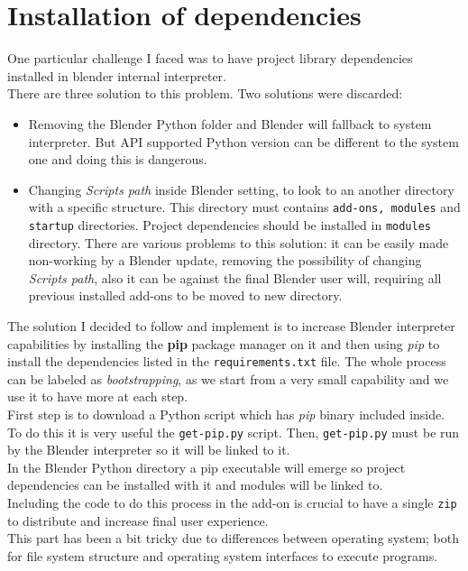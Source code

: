 \section{Installation of dependencies}
One particular challenge I faced was to have project library dependencies installed in blender internal interpreter. \\
There are three solution to this problem. Two solutions were discarded: 
\begin{itemize}
\item Removing the Blender Python folder and Blender will fallback to system interpreter. But API supported Python version can be different to the system one and doing this is dangerous.
\item Changing \textit{Scripts path} inside Blender setting, to look to an another directory with a specific structure. This directory must contains \texttt{add-ons, modules} and \texttt{startup} directories. Project dependencies should be installed in \texttt{modules} directory. There are various problems to this solution: it can be easily made non-working by a Blender update, removing the possibility of changing \textit{Scripts path}, also it can be against the final Blender user will, requiring all previous installed add-ons to be moved to new directory.
\end{itemize}
The solution I decided to follow and implement is to increase Blender interpreter capabilities by installing the \textbf{pip} package manager on it and then using \textit{pip} to install the dependencies listed in the \texttt{requirements.txt} file. The whole process can be labeled as \textit{bootstrapping}, as we start from a very small capability and we use it to have more at each step. \\
First step is to download a Python script which has \textit{pip} binary included inside. To do this it is very useful the \texttt{get-pip.py} script. \cite{get-pip}
Then, \texttt{get-pip.py} must be run by the Blender interpreter so it will be linked to it.  \\
In the Blender Python directory a pip executable will emerge so project dependencies can be installed with it and modules will be linked to. \\
Including the code to do this process in the add-on is crucial to have a single \texttt{zip} to distribute and increase final user experience. \\
This part has been a bit tricky due to differences between operating system; both for file system structure and operating system interfaces to execute programs. \\